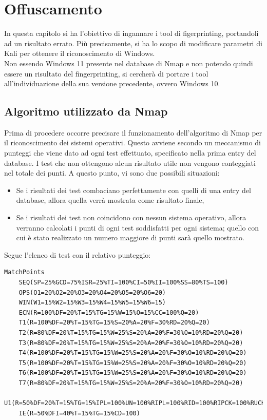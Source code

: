 \chapter{Offuscamento}

In questa capitolo si ha l'obiettivo di ingannare i tool di figerprinting, portandoli ad un risultato errato. Più precisamente, si ha lo scopo di modificare parametri di Kali per ottenere il riconoscimento di Windows.
\\
Non essendo Windows 11 presente nel database di Nmap e non potendo quindi essere un risultato del fingerprinting, si cercherà di portare i tool all'individuazione della sua versione precedente, ovvero Windows 10.

\section{Algoritmo utilizzato da Nmap}
Prima di procedere occorre precisare il funzionamento dell'algoritmo di Nmap per il riconoscimento dei sistemi operativi. Questo avviene secondo un meccanismo di punteggi che viene dato ad ogni test effettuato, specificato nella prima entry del database. I test che non ottengono alcun risultato utile non vengono conteggiati nel totale dei punti.
A questo punto, vi sono due possibili situazioni:
\begin{itemize}
	\item Se i risultati dei test combaciano perfettamente con quelli di una entry del database, allora quella verrà mostrata come risultato finale,
	\item Se i risultati dei test non coincidono con nessun sistema operativo, allora verranno calcolati i punti di ogni test soddisfatti per ogni sistema; quello con cui è stato realizzato un numero maggiore di punti sarà quello mostrato.
\end{itemize}

Segue l'elenco di test con il relativo punteggio:

\begin{lstlisting}[caption={Punteggi che Nmap attrribuisce ad ogni test}]
	MatchPoints
	SEQ(SP=25%GCD=75%ISR=25%TI=100%CI=50%II=100%SS=80%TS=100)
	OPS(O1=20%O2=20%O3=20%O4=20%O5=20%O6=20)
	WIN(W1=15%W2=15%W3=15%W4=15%W5=15%W6=15)
	ECN(R=100%DF=20%T=15%TG=15%W=15%O=15%CC=100%Q=20)
	T1(R=100%DF=20%T=15%TG=15%S=20%A=20%F=30%RD=20%Q=20)
	T2(R=80%DF=20%T=15%TG=15%W=25%S=20%A=20%F=30%O=10%RD=20%Q=20)
	T3(R=80%DF=20%T=15%TG=15%W=25%S=20%A=20%F=30%O=10%RD=20%Q=20)
	T4(R=100%DF=20%T=15%TG=15%W=25%S=20%A=20%F=30%O=10%RD=20%Q=20)
	T5(R=100%DF=20%T=15%TG=15%W=25%S=20%A=20%F=30%O=10%RD=20%Q=20)
	T6(R=100%DF=20%T=15%TG=15%W=25%S=20%A=20%F=30%O=10%RD=20%Q=20)
	T7(R=80%DF=20%T=15%TG=15%W=25%S=20%A=20%F=30%O=10%RD=20%Q=20)
	U1(R=50%DF=20%T=15%TG=15%IPL=100%UN=100%RIPL=100%RID=100%RIPCK=100%RUCK=100%RUD=100)
	IE(R=50%DFI=40%T=15%TG=15%CD=100)
\end{lstlisting}


